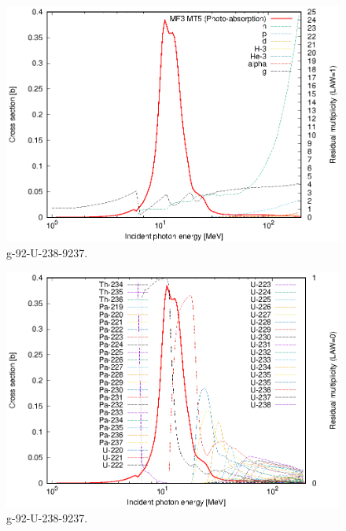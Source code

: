 \begin{figure}
 \includegraphics[width=\linewidth]{eps/g_92-U-238_9237.eps}
  \caption{g-92-U-238-9237.}
\end{figure}
\begin{figure}
 \includegraphics[width=\linewidth]{eps-law0/g_92-U-238_9237.eps}
 \caption{g-92-U-238-9237.}
\end{figure}
\newpage \clearpage

